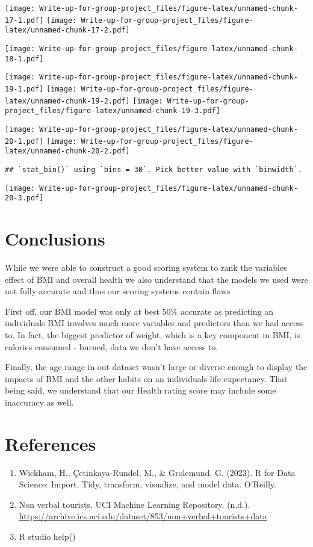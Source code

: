 \documentclass[
]{article}
\providecommand{\tightlist}{%
  \setlength{\itemsep}{0pt}\setlength{\parskip}{0pt}}
\begin{document}
\texttt{[image: Write-up-for-group-project\_files/figure-latex/unnamed-chunk-17-1.pdf]}
\texttt{[image: Write-up-for-group-project\_files/figure-latex/unnamed-chunk-17-2.pdf]}

\texttt{[image: Write-up-for-group-project\_files/figure-latex/unnamed-chunk-18-1.pdf]}

\texttt{[image: Write-up-for-group-project\_files/figure-latex/unnamed-chunk-19-1.pdf]}
\texttt{[image: Write-up-for-group-project\_files/figure-latex/unnamed-chunk-19-2.pdf]}
\texttt{[image: Write-up-for-group-project\_files/figure-latex/unnamed-chunk-19-3.pdf]}

\texttt{[image: Write-up-for-group-project\_files/figure-latex/unnamed-chunk-20-1.pdf]}
\texttt{[image: Write-up-for-group-project\_files/figure-latex/unnamed-chunk-20-2.pdf]}

\begin{verbatim}
## `stat_bin()` using `bins = 30`. Pick better value with `binwidth`.
\end{verbatim}

\texttt{[image: Write-up-for-group-project\_files/figure-latex/unnamed-chunk-20-3.pdf]}

\hypertarget{conclusions}{%
\section{Conclusions}\label{conclusions}}

While we were able to construct a good scoring system to rank the
variables effect of BMI and overall health we also understand that the
models we used were not fully accurate and thus our scoring systems
contain flaws

First off, our BMI model was only at best 50\% accurate as predicting an
individuals BMI involves much more variables and predictors than we had
access to. In fact, the biggest predictor of weight, which is a key
component in BMI, is calories consumed - burned, data we don't have
access to.

Finally, the age range in out dataset wasn't large or diverse enough to
display the impacts of BMI and the other habits on an individuals life
expectancy. That being said, we understand that our Health rating score
may include some inaccuracy as well.

\hypertarget{references}{%
\section{References}\label{references}}

\begin{enumerate}
\def\labelenumi{\arabic{enumi}.}
\tightlist
\item
  Wickham, H., Çetinkaya-Rundel, M., \& Grolemund, G. (2023). R for Data
  Science: Import, Tidy, transform, visualize, and model data. O'Reilly.
\item
  Non verbal tourists. UCI Machine Learning Repository. (n.d.).
  \url{https://archive.ics.uci.edu/dataset/853/non+verbal+tourists+data}
\item
  R studio help()
\end{enumerate}
\end{document}
